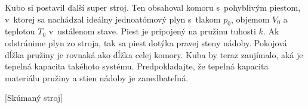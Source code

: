Kubo si postavil ďalší super stroj. Ten obsahoval komoru s~pohyblivým piestom, v~ktorej sa nachádzal ideálny jednoatómový plyn
s~tlakom $p_0$, objemom $V_0$ a teplotou $T_0$ v~ustálenom stave. Piest je pripojený na pružinu tuhosti $k$. Ak odstránime plyn
zo stroja, tak sa piest dotýka pravej steny nádoby. Pokojová dĺžka pružiny je rovnaká ako dĺžka celej komory. 
Kuba by teraz zaujímalo, aká je tepelná kapacita takéhoto systému. 
Predpokladajte, že tepelná kapacita materiálu pružiny a stien nádoby je zanedbateľná.

[Skúmaný stroj]